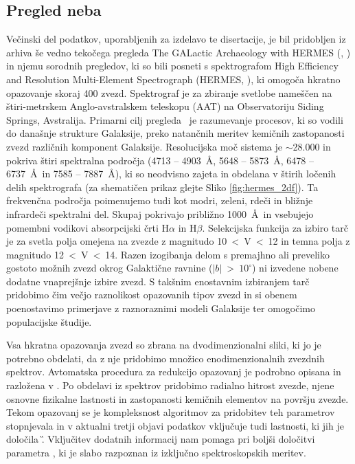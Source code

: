 \subsection{Pregled neba \Gh}
\label{sec:slo_galah}
Večinski del podatkov, uporabljenih za izdelavo te disertacije, je bil pridobljen iz arhiva še vedno tekočega pregleda The GALactic Archaeology with HERMES (\Gh, \cite{2015MNRAS.449.2604D}) in njemu sorodnih pregledov, ki so bili posneti s spektrografom High Efficiency and Resolution Multi-Element Spectrograph (HERMES, \cite{2010SPIE.7735E..09B, 2015JATIS...1c5002S}), ki omogoča hkratno opazovanje skoraj 400 zvezd. Spektrograf je za zbiranje svetlobe nameščen na štiri-metrskem Anglo-avstralskem teleskopu (AAT) na Observatoriju Siding Springs, Avstralija. Primarni cilj pregleda \Gh\ je razumevanje procesov, ki so vodili do današnje strukture Galaksije, preko natančnih meritev kemičnih zastopanosti zvezd različnih komponent Galaksije. Resolucijska moč sistema je $\sim$28.000 in pokriva štiri spektralna področja (4713 -- 4903~\AA, 5648 -- 5873~\AA, 6478 -- 6737~\AA\ in 7585 -- 7887~\AA), ki so neodvisno zajeta in obdelana v štirih ločenih delih spektrografa (za shematičen prikaz glejte Sliko \ref{fig:hermes_2df}). Ta frekvenčna področja poimenujemo tudi kot modri, zeleni, rdeči in bližnje infrardeči spektralni del. Skupaj pokrivajo približno 1000~\AA\ in vsebujejo pomembni vodikovi absorpcijski črti H$\alpha$ in H$\beta$. Selekcijska funkcija za izbiro tarč je za svetla polja omejena na zvezde z magnitudo 10~<~V~<~12 in temna polja z magnitudo 12~<~V~<~14. Razen izogibanja delom s premajhno ali preveliko gostoto možnih zvezd okrog Galaktične ravnine ($|b|$~>~$10^\circ$) ni izvedene nobene dodatne vnaprejšnje izbire zvezd. S takšnim enostavnim izbiranjem tarč pridobimo čim večjo raznolikost opazovanih tipov zvezd in si obenem poenostavimo primerjave z raznoraznimi modeli Galaksije ter omogočimo populacijske študije.

Vsa hkratna opazovanja zvezd so zbrana na dvodimenzionalni sliki, ki jo je potrebno obdelati, da z nje pridobimo množico enodimenzionalnih zvezdnih spektrov. Avtomatska procedura za redukcijo opazovanj je podrobno opisana in razložena v \citet{2017MNRAS.464.1259K}. Po obdelavi iz spektrov pridobimo radialno hitrost zvezde, njene osnovne fizikalne lastnosti in zastopanosti kemičnih elementov na površju zvezde. Tekom opazovanj se je kompleksnost algoritmov za pridobitev teh parametrov stopnjevala in v aktualni tretji objavi podatkov vključuje tudi lastnosti, ki jih je določila \G. Vključitev dodatnih informacij nam pomaga pri boljši določitvi parametra \Logg, ki je slabo razpoznan iz izključno spektroskopskih meritev.

